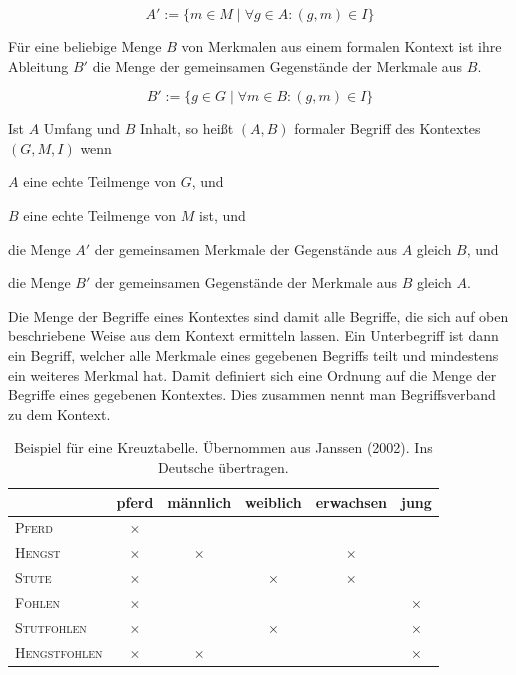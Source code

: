 \documentclass[pagesize,DIV=calc,12pt,draft]{scrreprt}
\begin{document}
\begin{equation*}
A' := \lbrace m \in M \; \vert \; \forall g \in A: (g,m) \in I\rbrace
\end{equation*}

Für eine beliebige Menge $B$ von Merkmalen aus einem formalen Kontext ist ihre Ableitung $B'$ die Menge der gemeinsamen Gegenstände der Merkmale aus $B$. 

\begin{equation*}
B' := \lbrace g \in G \; \vert \; \forall m \in B: (g,m) \in I\rbrace
\end{equation*}

Ist $A$ Umfang und $B$ Inhalt, so heißt $(A,B)$ formaler Begriff des Kontextes $(G,M,I)$ wenn

\begin{inparaenum}
\item
 $A$ eine echte Teilmenge von $G$, und
\item
 $B$ eine echte Teilmenge von $M$ ist, und
\item
 die Menge $A'$ der gemeinsamen Merkmale der Gegenstände aus $A$ gleich
 $B$, und
\item
 die Menge $B'$ der gemeinsamen Gegenstände der Merkmale aus $B$ gleich
 $A$.
\end{inparaenum}

Die Menge der Begriffe eines Kontextes sind damit alle Begriffe, die sich auf oben beschriebene Weise aus dem Kontext ermitteln lassen. 
Ein Unterbegriff ist dann ein Begriff, welcher alle Merkmale eines gegebenen Begriffs teilt und mindestens ein weiteres Merkmal hat. 
Damit definiert sich eine Ordnung auf die Menge der Begriffe eines gegebenen Kontextes. 
Dies zusammen nennt man Begriffsverband zu dem Kontext. 

\begin{table}[ht]
\centering
\renewcommand{\arraystretch}{2}
\begin{tabular}{@{}lccccc@{}}
\toprule
&
pferd &
männlich &
weiblich &
erwachsen &
jung\\
\midrule
\textsc{Pferd}	&	$\times$	&&&&\\

\textsc{Hengst}	&	$\times$	&	$\times$	&&	$\times$	&\\

\textsc{Stute}	&	$\times$	&&	$\times$	&	$\times$	&\\

\textsc{Fohlen}	&	$\times$	&&&&	$\times$\\

\textsc{Stutfohlen}	&	$\times$	&&	$\times$	&&	$\times$\\

\textsc{Hengstfohlen}	&	$\times$	&	$\times$	&&&	$\times$\\
\bottomrule
\end{tabular}
\caption{Beispiel für eine Kreuztabelle. Übernommen aus Janssen (2002). Ins Deutsche übertragen.}
\end{table}
\end{document}

